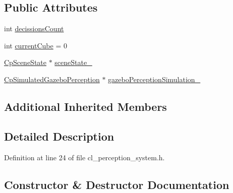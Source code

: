 \subsection*{Public Attributes}
\begin{DoxyCompactItemize}
\item 
int \hyperlink{classsm__moveit__4_1_1cl__perception__system_1_1ClPerceptionSystem_ac41f768142251a6a4330c6ca1050b2fe}{decissions\+Count}
\item 
int \hyperlink{classsm__moveit__4_1_1cl__perception__system_1_1ClPerceptionSystem_ae2a80b803814af8b3c87f810f2728af0}{current\+Cube} = 0
\item 
\hyperlink{classsm__moveit__4_1_1cl__perception__system_1_1CpSceneState}{Cp\+Scene\+State} $\ast$ \hyperlink{classsm__moveit__4_1_1cl__perception__system_1_1ClPerceptionSystem_a82ea8feeb2fa43349f91ed59137b3890}{scene\+State\+\_\+}
\item 
\hyperlink{classsm__moveit__4_1_1cl__perception__system_1_1CpSimulatedGazeboPerception}{Cp\+Simulated\+Gazebo\+Perception} $\ast$ \hyperlink{classsm__moveit__4_1_1cl__perception__system_1_1ClPerceptionSystem_a027c07df3f1a2cc0c30be111b27dbe5c}{gazebo\+Perception\+Simulation\+\_\+}
\end{DoxyCompactItemize}
\subsection*{Additional Inherited Members}


\subsection{Detailed Description}


Definition at line 24 of file cl\+\_\+perception\+\_\+system.\+h.



\subsection{Constructor \& Destructor Documentation}
\mbox{\label{classsm__moveit__4_1_1cl__perception__system_1_1ClPerceptionSystem_aeb969985d995c4ba91f1f2f693fe2c3a}} 
